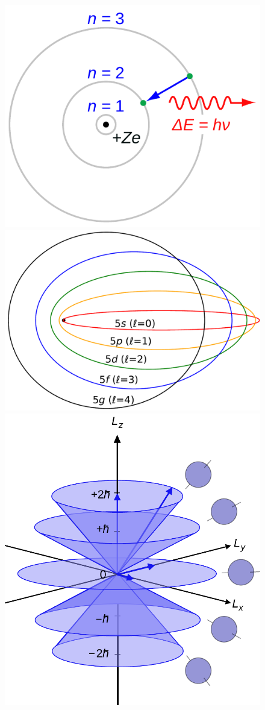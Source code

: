 	\begin{figure}
		\begin{minipage}{\linewidth}
			\centering\captionsetup[subfigure]{justification=centering}
			\includegraphics[width=.65\linewidth]{fig/chapt2/Bohr_atom_model.pdf}
			\subcaption{\label{fig:quantum-numbers:A}}
			\includegraphics[width=.85\linewidth]{fig/chapt2/Sommerfeld_ellipses.pdf}
			\subcaption{\label{fig:quantum-numbers:B}}
			\includegraphics[width=.8\linewidth]{fig/chapt2/Vector_model_of_orbital_angular_momentum.pdf}

\end{minipage}
\end{figure}
